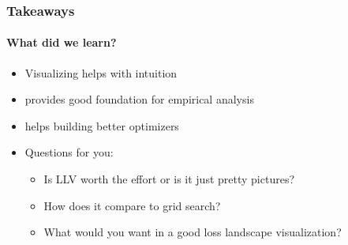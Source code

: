 \documentclass[9pt]{beamer}
\begin{document}
\begin{frame}
\frametitle{Takeaways}
\framesubtitle{What did we learn?}
\begin{itemize}%
	\item Visualizing helps with intuition%
	\item provides good foundation for empirical analysis
	\item helps building better optimizers
	\item \color{red}Questions for you:
	\begin{itemize}
		\item \color{red}Is LLV worth the effort or is it just pretty pictures?
		\item \color{red}How does it compare to grid search?
		\item \color{red}What would you want in a good loss landscape visualization?
	\end{itemize}
\end{itemize}
\end{frame} 
\end{document}
